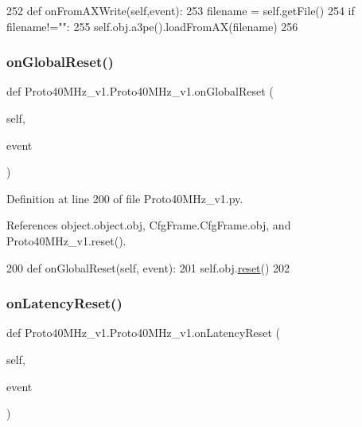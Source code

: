 \begin{DoxyCode}
252     \textcolor{keyword}{def }onFromAXWrite(self,event):
253         filename = self.getFile()
254         \textcolor{keywordflow}{if} filename!=\textcolor{stringliteral}{""}:
255             self.obj.a3pe().loadFromAX(filename)
256 
\end{DoxyCode}
\mbox{\label{classProto40MHz__v1_1_1Proto40MHz__v1_a3396648f1e18f32dfc0e2f9edb38c723}} 
\subsubsection{\texorpdfstring{on\+Global\+Reset()}{onGlobalReset()}}
{\footnotesize\ttfamily def Proto40\+M\+Hz\+\_\+v1.\+Proto40\+M\+Hz\+\_\+v1.\+on\+Global\+Reset (\begin{DoxyParamCaption}\item[{}]{self,  }\item[{}]{event }\end{DoxyParamCaption})}



Definition at line 200 of file Proto40\+M\+Hz\+\_\+v1.\+py.



References object.\+object.\+obj, Cfg\+Frame.\+Cfg\+Frame.\+obj, and Proto40\+M\+Hz\+\_\+v1.\+reset().


\begin{DoxyCode}
200     \textcolor{keyword}{def }onGlobalReset(self, event):
201         self.obj.\hyperlink{namespaceshell_a2f31bbe4baf894f4863c4d392239ab8b}{reset}()
202 
\end{DoxyCode}
\mbox{\label{classProto40MHz__v1_1_1Proto40MHz__v1_a1558f7e9c28374df38db7229076f621c}} 
\subsubsection{\texorpdfstring{on\+Latency\+Reset()}{onLatencyReset()}}
{\footnotesize\ttfamily def Proto40\+M\+Hz\+\_\+v1.\+Proto40\+M\+Hz\+\_\+v1.\+on\+Latency\+Reset (\begin{DoxyParamCaption}\item[{}]{self,  }\item[{}]{event }\end{DoxyParamCaption})}



